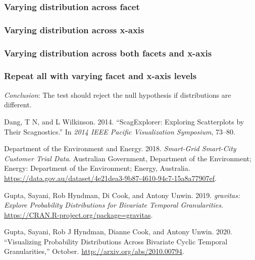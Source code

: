 \documentclass[
]{article}
\begin{document}
\hypertarget{varying-distribution-across-facet}{%
\subsubsection{Varying distribution across facet}\label{varying-distribution-across-facet}}

\hypertarget{varying-distribution-across-x-axis}{%
\subsubsection{Varying distribution across x-axis}\label{varying-distribution-across-x-axis}}

\hypertarget{varying-distribution-across-both-facets-and-x-axis}{%
\subsubsection{Varying distribution across both facets and x-axis}\label{varying-distribution-across-both-facets-and-x-axis}}

\hypertarget{repeat-all-with-varying-facet-and-x-axis-levels}{%
\subsubsection{Repeat all with varying facet and x-axis levels}\label{repeat-all-with-varying-facet-and-x-axis-levels}}

\emph{Conclusion}: The test should reject the null hypothesis if distributions are different.

\hypertarget{refs}{}
\leavevmode\hypertarget{ref-Dang2014-tw}{}%
Dang, T N, and L Wilkinson. 2014. ``ScagExplorer: Exploring Scatterplots by Their Scagnostics.'' In \emph{2014 IEEE Pacific Visualization Symposium}, 73--80.

\leavevmode\hypertarget{ref-smart-meter}{}%
Department of the Environment and Energy. 2018. \emph{Smart-Grid Smart-City Customer Trial Data}. Australian Government, Department of the Environment; Energy: Department of the Environment; Energy, Australia. \url{https://data.gov.au/dataset/4e21dea3-9b87-4610-94c7-15a8a77907ef}.

\leavevmode\hypertarget{ref-R-gravitas}{}%
Gupta, Sayani, Rob Hyndman, Di Cook, and Antony Unwin. 2019. \emph{gravitas: Explore Probability Distributions for Bivariate Temporal Granularities}. \url{https://CRAN.R-project.org/package=gravitas}.

\leavevmode\hypertarget{ref-Gupta2020-vo}{}%
Gupta, Sayani, Rob J Hyndman, Dianne Cook, and Antony Unwin. 2020. ``Visualizing Probability Distributions Across Bivariate Cyclic Temporal Granularities,'' October. \url{http://arxiv.org/abs/2010.00794}.
\end{document}
